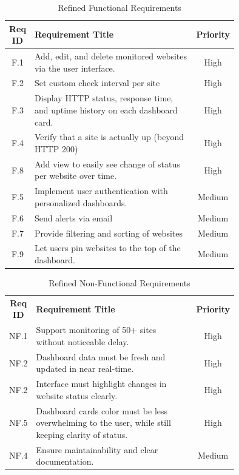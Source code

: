 \begin{table}[H]
    \centering
    \caption{Refined Functional Requirements}
    \label{tab:functional_reqs_refined}
    \begin{tabular}{|c|>{\raggedright\arraybackslash}p{0.75\linewidth}|c|}
        \hline
        \textbf{Req ID} & \textbf{Requirement Title} & \textbf{Priority} \\
        \hline
        F.1 & Add, edit, and delete monitored websites via the user interface.& High \\ \hline 
 F.2& Set custom check interval per site&High\\ \hline 
 F.3 & Display HTTP status, response time, and uptime history on each dashboard card.&High \\\hline
        \hline
        F.4& Verify that a site is actually up (beyond HTTP 200)& High \\ \hline 
 F.8& Add view to easily see change of status per website over time.&High\\\hline
        \hline
        F.5 & Implement user authentication with personalized dashboards. & Medium \\
        \hline
        F.6 & Send alerts via email& Medium \\
        \hline
        F.7 & Provide filtering and sorting of websites& Medium \\ \hline 
 F.9& Let users pin websites to the top of the dashboard.&Medium\\\hline
    \end{tabular}
\end{table}

\begin{table}[H]
    \centering
    \caption{Refined Non-Functional Requirements}
    \label{tab:nonfunctional_reqs_refined}
    \begin{tabular}{|c|>{\raggedright\arraybackslash}p{0.75\linewidth}|c|}
        \hline
        \textbf{Req ID} & \textbf{Requirement Title} & \textbf{Priority} \\
 NF.1& Support monitoring of 50+ sites without noticeable delay.&High\\\hline
        \hline
        NF.2& Dashboard data must be fresh and updated in near real-time. & High \\
        \hline
        NF.2 & Interface must highlight changes in website status clearly. & High \\ \hline 
 NF.5& Dashboard cards color must be less overwhelming to the user, while still keeping clarity of status.&High\\
        \hline
        NF.4 & Ensure maintainability and clear documentation. & Medium \\\hline
    \end{tabular}
\end{table}

